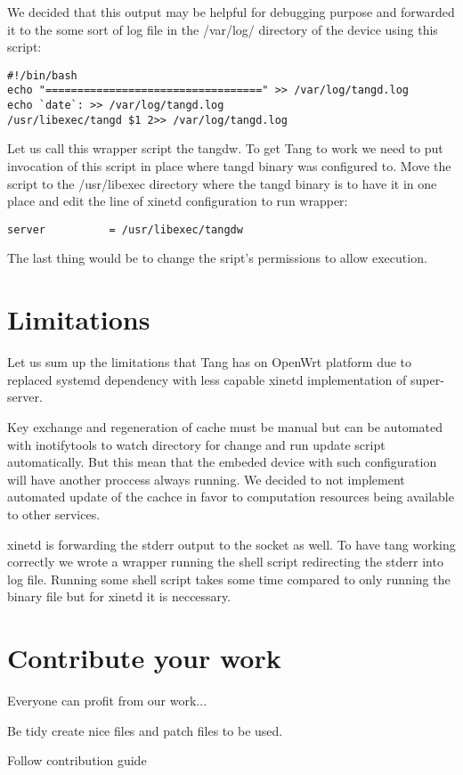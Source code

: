 We decided that this output may be helpful for debugging purpose and forwarded it to the some sort of log file in the /var/log/ directory of the device using this script:
\begin{lstlisting}[columns=fixed,basicstyle=\ttfamily\footnotesize,tabsize=4,backgroundcolor=\color{yellow!10}]
#!/bin/bash
echo "==================================" >> /var/log/tangd.log
echo `date`: >> /var/log/tangd.log
/usr/libexec/tangd $1 2>> /var/log/tangd.log
\end{lstlisting}
Let us call this wrapper script the tangdw.
To get Tang to work we need to put invocation of this script in place where tangd binary was configured to.
Move the script to the /usr/libexec directory where the tangd binary is to have it in one place and edit the line of xinetd configuration to run wrapper:
\begin{lstlisting}[columns=fixed,basicstyle=\ttfamily\footnotesize,tabsize=4,backgroundcolor=\color{yellow!10}]
    server          = /usr/libexec/tangdw
\end{lstlisting}
The last thing would be to change the sript's permissions to allow execution.



\section{Limitations} 

Let us sum up the limitations that Tang has on OpenWrt platform due to replaced systemd dependency with less capable xinetd implementation of super-server.

Key exchange and regeneration of cache must be manual but  can be automated with inotifytools to watch directory for change and run update script automatically.
But this mean that the embeded device with such configuration will have another proccess always running.
We decided to not implement automated update of the cachce in favor to computation resources being available to other services.

xinetd is forwarding the stderr output to the socket as well.
To have tang working correctly we wrote a wrapper running the shell script redirecting the stderr into log file.
Running some shell script takes some time compared to only running the binary file but for xinetd it is neccessary.



\section{Contribute your work}\label{contrib}

Everyone can profit from our work...

Be tidy create nice files and patch files to be used.

Follow contribution guide
